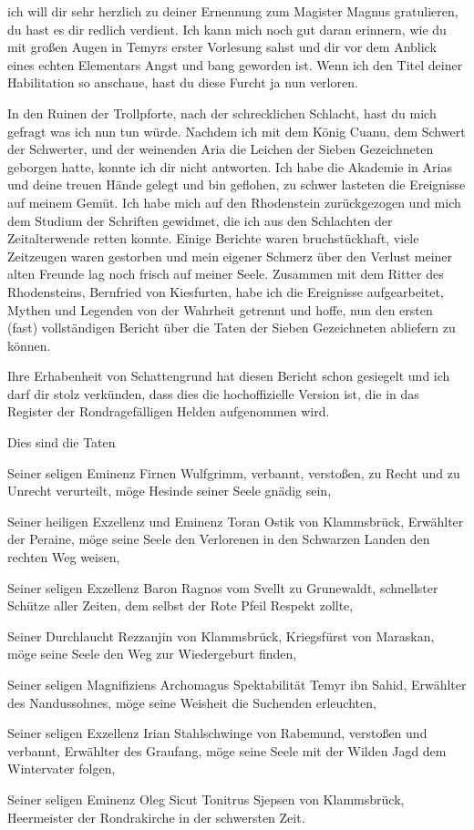 ich will dir sehr herzlich zu deiner Ernennung zum Magister Magnus gratulieren, du hast es dir redlich verdient. Ich kann mich noch gut daran erinnern, wie du mit großen Augen in Temyrs erster Vorlesung sahst und dir vor dem Anblick eines echten Elementars Angst und bang geworden ist. Wenn ich den Titel deiner Habilitation so anschaue, hast du diese Furcht ja nun verloren.

In den Ruinen der Trollpforte, nach der schrecklichen Schlacht, hast du mich gefragt was ich nun tun würde. Nachdem ich mit dem König Cuanu, dem Schwert der Schwerter, und der weinenden Aria die Leichen der Sieben Gezeichneten geborgen hatte, konnte ich dir nicht antworten. Ich habe die Akademie in Arias und deine treuen Hände gelegt und bin geflohen, zu schwer lasteten die Ereignisse auf meinem Gemüt. Ich habe mich auf den Rhodenstein zurückgezogen und mich dem Studium der Schriften gewidmet, die ich aus den Schlachten der Zeitalterwende retten konnte. Einige Berichte waren bruchstückhaft, viele Zeitzeugen waren gestorben und mein eigener Schmerz über den Verlust meiner alten Freunde lag noch frisch auf meiner Seele. Zusammen mit dem Ritter des Rhodensteins, Bernfried von Kiesfurten, habe ich die Ereignisse aufgearbeitet, Mythen und Legenden von der Wahrheit getrennt und hoffe, nun den ersten (fast) vollständigen Bericht über die Taten der Sieben Gezeichneten abliefern zu können.

Ihre Erhabenheit von Schattengrund hat diesen Bericht schon gesiegelt und ich darf dir stolz verkünden, dass dies die hochoffizielle Version ist, die in das Register der Rondragefälligen Helden aufgenommen wird.

Dies sind die Taten

Seiner seligen Eminenz Firnen Wulfgrimm, verbannt, verstoßen, zu Recht und zu Unrecht verurteilt, möge Hesinde seiner Seele gnädig sein,\par\smallskip
Seiner heiligen Exzellenz und Eminenz Toran Ostik von Klammsbrück, Erwählter der Peraine, möge seine Seele den Verlorenen in den Schwarzen Landen den rechten Weg weisen,\par\smallskip
Seiner seligen Exzellenz Baron Ragnos vom Svellt zu Grunewaldt, schnellster Schütze aller Zeiten, dem selbst der Rote Pfeil  Respekt zollte,\par\smallskip
Seiner Durchlaucht Rezzanjin von Klammsbrück, Kriegsfürst von Maraskan, möge seine Seele den Weg zur Wiedergeburt finden,\par\smallskip
Seiner seligen Magnifiziens Archomagus Spektabilität Temyr ibn Sahid, Erwählter des Nandussohnes, möge seine Weisheit die Suchenden erleuchten,\par\smallskip
Seiner seligen Exzellenz Irian Stahlschwinge von Rabemund, verstoßen und verbannt, Erwählter des Graufang, möge seine Seele mit der Wilden Jagd dem Wintervater folgen,\par\smallskip
Seiner seligen Eminenz Oleg Sicut Tonitrus Sjepsen von Klammsbrück, Heermeister der Rondrakirche in der schwersten Zeit.

